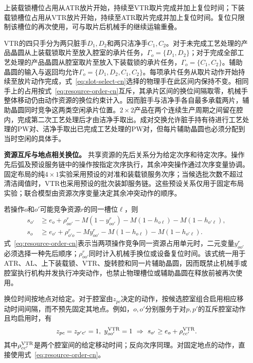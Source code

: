 \documentclass[final,5p,times,twocolumn]{elsarticle}
\begin{document}
上装载锁槽位占用从ATR放片开始，持续至VTR取片完成并加上复位时间；下装载锁槽位占用从VTR放片开始，持续至ATR取片完成并加上复位时间。复位只限制该槽位的再次使用，可与取片后机械手的继续运输重叠。

VTR的四只手分为两只脏手$D_1,D_2$和两只洁净手$C_1,C_2$。对于未完成工艺处理的产品晶圆从上装载锁取片至放入腔室的承片任务，$\Gamma_o=\{D_1,D_2\}$；对于完成全部工艺处理的产品晶圆从腔室取片至放入下装载锁的承片任务，$\Gamma_o=\{C_1,C_2\}$。辅助晶圆的输入与返回均允许$\Gamma_o=\{D_1,D_2,C_1,C_2\}$。每项承片任务从取片动作开始持续至放片动作完成，式~\eqref{eq:slot-select-cn}选择的物理手在此区间内保持不变。相同手上的占用按式~\eqref{eq:resource-order-cn}互斥，其承片区间的换位间隔取零，机械手整体移动仍由动作资源的换位约束计入。因而脏手与洁净手各自最多承载两片，辅助晶圆同时竞争这两类空闲承片位置。$2\times2$产品在两个连续生产周期之间留在腔内，完成第二次工艺处理后才由洁净手取出。成对交换允许脏手持有待进行工艺处理的PW对、洁净手取出已完成工艺处理的PW对，但每片辅助晶圆也必须分配到当时空闲的具体手。

\noindent\textbf{资源互斥与地点相关换位。}
共享资源的先后关系分为给定次序和待定次序。操作先后弧及预设服务链中的操作按指定次序执行，其余冲突操作通过次序变量协调。固定布局的纯$4\times1$实验采用预设的对准和装载锁服务次序；当候选批次数不超过清洁阈值时，VTR也采用预设的批次装卸服务链。这些预设关系仅用于固定布局实验；联合模型由资源次序变量决定其余冲突动作的顺序。

若操作$o$和$o'$可能竞争资源$r$的同一槽位$\ell$，则
\begin{equation}
\begin{aligned}
s_{o'}&\ge e_o+\rho^r_{oo'}-M(1-y^r_{oo'})
-M(1-h_{o\ell})-M(1-h_{o'\ell}),\\
s_o&\ge e_{o'}+\rho^r_{o'o}-My^r_{oo'}
-M(1-h_{o\ell})-M(1-h_{o'\ell}).
\end{aligned}
\label{eq:resource-order-cn}
\end{equation}
式~\eqref{eq:resource-order-cn}表示当两项操作竞争同一资源占用单元时，二元变量$y^r_{oo'}$必须选择一种先后顺序；$\rho^r_{oo'}$同时计入机械手换位或设备复位时间。该式统一用于ATR、AL、上下装载锁、VTR、旋转腔和同一片辅助晶圆，因而既禁止机械手或腔室执行机构并发执行冲突动作，也禁止物理槽位或辅助晶圆在释放前被再次使用。

换位时间按地点对给定。对于腔室由$z_{pc}$决定的动作，按候选腔室组合启用相应移动时间间隔，而不预先固定其地点。例如，$o,o'$分别服务于对$p,p'$的互斥腔室动作且均启用时，有
\begin{equation}
\begin{aligned}
z_{pc}=z_{p'c'}=1,\ y^{\rm VTR}_{oo'}=1
\ \Rightarrow\ s_{o'}\ge e_o+\rho^{\rm VTR}_{cc'}.
\end{aligned}
\label{eq:location-travel-cn}
\end{equation}
其中$\rho^{\rm VTR}_{cc'}$是两个腔室间的给定移动时间；反向次序同理。对固定地点的动作，直接使用式~\eqref{eq:resource-order-cn}。
\end{document}
